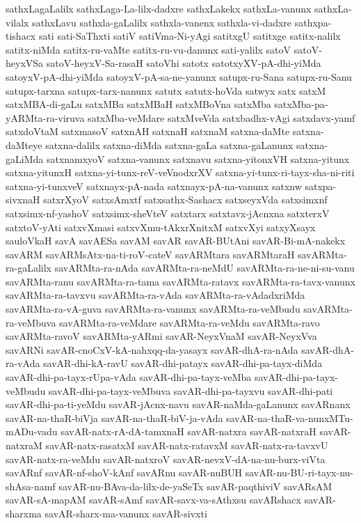 {sathxLagaLalilx
sathxLaga-La-lilx-dadxre
sathxLakekx
sathxLa-vanunx
sathxLa-vilalx
sathxLavu
sathxla-gaLalilx
sathxla-vanenx
sathxla-vi-dadxre
sathxpa-tishacx
sati
sati-SaThxti
satiV
satiVma-Ni-yAgi
satitxgU
satitxge
satitx-nalilx
satitx-niMda
satitx-ru-vaMte
satitx-ru-vu-danunx
sati-yalilx
satoV
satoV-heyxVSa
satoV-heyxV-Sa-rasaH
satoVhi
satotx
satotxyXV-pA-dhi-yiMda
satoyxV-pA-dhi-yiMda
satoyxV-pA-sa-ne-yanunx
satupx-ru-Sana
satupx-ru-Sanu
satupx-tarxna
satupx-tarx-nanunx
satutx
satutx-hoVda
satwyx
satx
satxM
satxMBA-di-gaLu
satxMBa
satxMBaH
satxMBoVna
satxMba
satxMba-pa-yARMta-ra-viruva
satxMba-veMdare
satxMveVda
satxbadhx-vAgi
satxdavx-yamf
satxdoVtaM
satxmasoV
satxnAH
satxnaH
satxnaM
satxna-daMte
satxna-daMteye
satxna-dalilx
satxna-diMda
satxna-gaLa
satxna-gaLanunx
satxna-gaLiMda
satxnamxyoV
satxna-vanunx
satxnavu
satxna-yitonxVH
satxna-yitunx
satxna-yitunxH
satxna-yi-tunx-reV-veVnodxrXV
satxna-yi-tunx-ri-tayx-sha-ni-riti
satxna-yi-tunxveV
satxnayx-pA-nada
satxnayx-pA-na-vanunx
satxnw
satxpa-sivxnaH
satxrXyoV
satxsAmxtf
satxsathx-Sashacx
satxseyxVda
satxsimxnf
satxsimx-nf-yashoV
satxsimx-sheVteV
satxtarx
satxtavx-jAcnxna
satxterxV
satxtoV-yAti
satxvXmasi
satxvXmu-tAkxrXnitxM
satxvXyi
satxyXsayx
sauloVkaH
savA
savAESa
savAM
savAR
savAR-BUtAni
savAR-Bi-mA-nakekx
savARM
savARMsAtx-na-ti-roV-cateV
savARMtara
savARMtaraH
savARMta-ra-gaLalilx
savARMta-ra-nAda
savARMta-ra-neMdU
savARMta-ra-ne-ni-su-vanu
savARMta-ranu
savARMta-ra-tama
savARMta-ratavx
savARMta-ra-tavx-vanunx
savARMta-ra-tavxvu
savARMta-ra-vAda
savARMta-ra-vAdadxriMda
savARMta-ra-vA-guva
savARMta-ra-vanunx
savARMta-ra-veMbudu
savARMta-ra-veMbuva
savARMta-ra-veMdare
savARMta-ra-veMdu
savARMta-ravo
savARMta-ravoV
savARMta-yARmi
savAR-NeyxVnaM
savAR-NeyxVva
savARNi
savAR-cnoCxV-kA-nahxqq-da-yasayx
savAR-dhA-ra-nAda
savAR-dhA-ra-vAda
savAR-dhi-kA-ravU
savAR-dhi-patayx
savAR-dhi-pa-tayx-diMda
savAR-dhi-pa-tayx-rUpa-vAda
savAR-dhi-pa-tayx-veMba
savAR-dhi-pa-tayx-veMbudu
savAR-dhi-pa-tayx-veMbuva
savAR-dhi-pa-tayxvu
savAR-dhi-pati
savAR-dhi-pa-ti-yeMdu
savAR-jAcnx-navu
savAR-naMda-gaLanunx
savARnanx
savAR-na-thaR-biVja
savAR-na-thaR-biV-ja-vAda
savAR-na-thaR-va-nunxMTu-mADu-vadu
savAR-natx-rA-dA-tamxnaH
savAR-natxra
savAR-natxraH
savAR-natxraM
savAR-natx-rasatxM
savAR-natx-ratavxM
savAR-natx-ra-tavxvU
savAR-natx-ra-veMdu
savAR-natxroV
savAR-nevxV-dA-na-nu-burx-viVta
savARnf
savAR-nf-shoV-kAnf
savARnu
savAR-nuBUH
savAR-nu-BU-ri-tayx-nu-shAsa-namf
savAR-nu-BAva-da-lilx-de-yaSeTx
savAR-paqthiviV
savARsAM
savAR-sA-mapAM
savAR-sAmf
savAR-savx-va-sAthxsu
savARshacx
savAR-sharxma
savAR-sharx-ma-vanunx
savAR-sivxti
}
